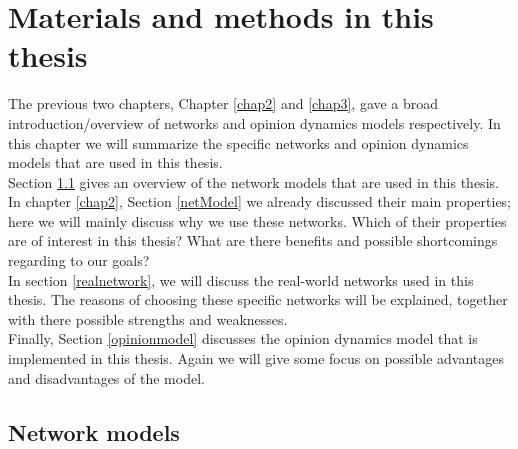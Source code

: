 \documentclass[11 pt , letterpaper , twoside , openright]{book}
\begin{document}
\chapter{Materials and methods in this thesis}\label{chap4}

The previous two chapters, Chapter \ref{chap2} and \ref{chap3}, gave a broad introduction/overview of networks and opinion dynamics models respectively. In this chapter we will summarize the specific networks and opinion dynamics models that are used in this thesis. \\
Section \ref{networkmodel} gives an overview of the network models that are used in this thesis. In chapter \ref{chap2}, Section \ref{netModel} we already discussed their main properties; here we will mainly discuss why we use these networks. Which of their properties are of interest in this thesis? What are there benefits and possible shortcomings regarding to our goals?\\
In section \ref{realnetwork}, we will discuss the real-world networks used in this thesis. The reasons of choosing these specific networks will be explained, together with there possible strengths and weaknesses.\\ %
Finally, Section \ref{opinionmodel} discusses the opinion dynamics model that is implemented in this thesis. Again we will give some focus on possible advantages and disadvantages of the model.


\section{Network models}\label{networkmodel}
\end{document}
